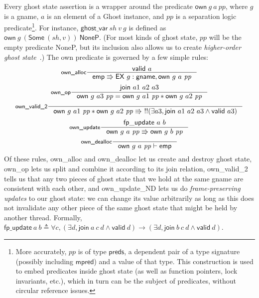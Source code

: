 \documentclass[11pt]{article}
\begin{document}
Every ghost state assertion is a wrapper around the predicate $\mathsf{own}\ g\ a\ \mathit{pp}$, where $g$ is a \textsf{gname}, $a$ is an element of a \textsf{Ghost} instance, and $\mathit{pp}$ is a separation logic predicate\footnote{More accurately, $\mathit{pp}$ is of type $\mathsf{preds}$, a dependent pair of a type signature (possibly including $\mathsf{mpred}$) and a value of that type. This construction is used to embed predicates inside ghost state (as well as function pointers, lock invariants, etc.), which in turn can be the subject of predicates, without circular reference issues.}. For instance, $\mathsf{ghost\_var}\ \mathit{sh}\ v\ g$ is defined as $\mathsf{own}\ g\ (\mathsf{Some}\ (\mathit{sh}, v))\ \mathsf{NoneP}$. (For most kinds of ghost state, $\mathit{pp}$ will be the empty predicate \textsf{NoneP}, but its inclusion also allows us to create \emph{higher-order ghost state}~\cite{hogs}.) The \textsf{own} predicate is governed by a few simple rules:
$$\inference[\textsf{own\_alloc}]{\mathsf{valid}\ a}{\mathsf{emp} \Rrightarrow \mathsf{EX}\ g : \mathsf{gname}, \mathsf{own}\ g\ a\ \mathit{pp}}$$
$$\inference[\textsf{own\_op}]{\mathsf{join}\ a1\ a2\ a3}{\mathsf{own}\ g\ a3\ \mathit{pp} = \mathsf{own}\ g\ a1\ \mathit{pp} * \mathsf{own}\ g\ a2\ \mathit{pp}}$$
$$\inference[\textsf{own\_valid\_2}]{}{\mathsf{own}\ g\ a1\ \mathit{pp} * \mathsf{own}\ g\ a2\ \mathit{pp} \Rrightarrow\ !!(\exists a3, \mathsf{join}\ a1\ a2\ a3 \land \mathsf{valid}\ a3)}$$
$$\inference[\textsf{own\_update}]{\mathsf{fp\_update}\ a\ b}{\mathsf{own}\ g\ a\ \mathit{pp} \Rrightarrow \mathsf{own}\ g\ b\ \mathit{pp}}$$
$$\inference[\textsf{own\_dealloc}]{}{\mathsf{own}\ g\ a\ \mathit{pp} \vdash \mathsf{emp}}$$
Of these rules, \textsf{own\_alloc} and \textsf{own\_dealloc} let us create and destroy ghost state, \textsf{own\_op} lets us split and combine it according to its \textsf{join} relation, \textsf{own\_valid\_2} tells us that any two pieces of ghost state that we hold at the same \textsf{gname} are consistent with each other, and \textsf{own\_update\_ND} lets us do \emph{frame-preserving updates} to our ghost state: we can change its value arbitrarily as long as this does not invalidate any other piece of the same ghost state that might be held by another thread. Formally, $\mathsf{fp\_update}\ a\ b \triangleq \forall c, (\exists d, \mathsf{join}\ a\ c\ d \land \mathsf{valid}\ d) \rightarrow (\exists d, \mathsf{join}\ b\ c\ d \land \mathsf{valid}\ d)$.
\end{document}
